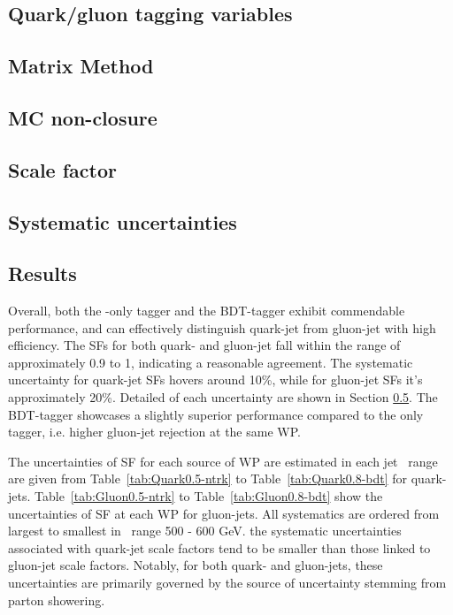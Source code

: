 \subsection{Quark/gluon tagging variables}
\label{sec:QG-var}


\subsection{Matrix Method}
\label{sec:QG-method}


\subsection{MC non-closure}
\label{sec:QG-closure}


\subsection{Scale factor}
\label{sec:QG-SF}


\subsection{Systematic uncertainties}
\label{sec:QG-syst}


\subsection{Results}

Overall, both the \ntrk-only tagger and the BDT-tagger exhibit commendable performance, and can effectively distinguish quark-jet from gluon-jet with high efficiency. The SFs for both quark- and gluon-jet  fall within the range of approximately 0.9 to 1, indicating a reasonable agreement. The systematic uncertainty for quark-jet SFs hovers around 10\%, while for gluon-jet SFs it's approximately 20\%.  Detailed of each uncertainty are shown in Section \ref{sec:QG-syst}. The BDT-tagger showcases a slightly superior performance compared to the {\ntrk} only tagger, i.e. higher gluon-jet rejection at the same WP.

The uncertainties of SF for each source of WP are estimated in each jet \pt~range are given from Table~\ref{tab:Quark0.5-ntrk} to Table~\ref{tab:Quark0.8-bdt} for quark-jets. Table~\ref{tab:Gluon0.5-ntrk} to Table~\ref{tab:Gluon0.8-bdt} show the uncertainties of SF at each WP for gluon-jets. All systematics are ordered from largest to smallest in \pt~range 500 - 600 GeV. the systematic uncertainties associated with quark-jet scale factors tend to be smaller than those linked to gluon-jet scale factors. Notably, for both quark- and gluon-jets, these uncertainties are primarily governed by the source of uncertainty stemming from parton showering.


